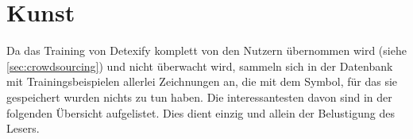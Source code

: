 \chapter{Kunst}
\label{cha:kunst}

Da das Training von Detexify komplett von den Nutzern übernommen wird (siehe \ref{sec:crowdsourcing}) und nicht überwacht wird, sammeln sich in der Datenbank mit Trainingsbeispielen allerlei Zeichnungen an, die mit dem Symbol, für das sie gespeichert wurden nichts zu tun haben. Die interessantesten davon sind in der folgenden Übersicht aufgelistet. Dies dient einzig und allein der Belustigung des Lesers.
